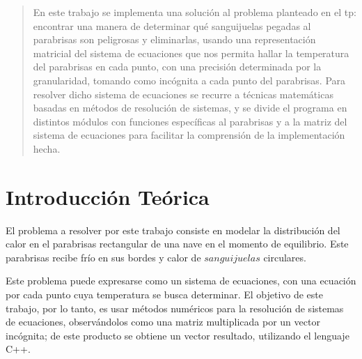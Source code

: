 \documentclass[a4paper]{article}
\begin{document}
\thispagestyle{empty}

\maketitle
\newpage

\thispagestyle{empty}
\vfill
\begin{abstract}
En este trabajo se implementa una solución al problema planteado en el tp: encontrar una manera de determinar qué sanguijuelas pegadas al parabrisas son peligrosas y eliminarlas, usando una representación matricial del sistema de ecuaciones que nos permita hallar la temperatura del parabrisas en cada punto, con una precisión determinada por la granularidad, tomando como incógnita a cada punto del parabrisas.\newline
Para resolver dicho sistema de ecuaciones se recurre a técnicas matemáticas basadas en métodos de resolución de sistemas, y se divide el programa en distintos módulos con funciones específicas al parabrisas y a la matriz del sistema de ecuaciones para facilitar la comprensión de la implementación hecha.
\end{abstract}

\thispagestyle{empty}
\vspace{3cm}
\tableofcontents
\newpage


\newpage

\section{Introducci\'{o}n Te\'{o}rica}
\label{sec:intro}

El problema a resolver por este trabajo consiste en modelar la distribución del calor en el parabrisas rectangular de una nave en el momento de equilibrio. Este parabrisas recibe frío en sus bordes y calor de $sanguijuelas$ circulares.

Este problema puede expresarse como un sistema de ecuaciones, con una ecuación por cada punto cuya temperatura se busca determinar. El objetivo de este trabajo, por lo tanto, es usar métodos numéricos para la resolución de sistemas de ecuaciones, observándolos como una matriz multiplicada por un vector incógnita; de este producto se obtiene un vector resultado, utilizando el lenguaje C++.
\end{document}
